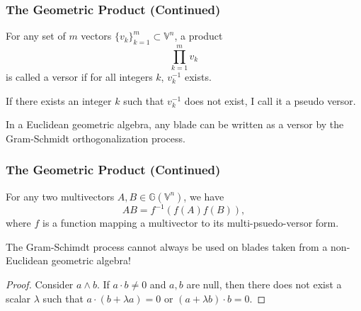 \documentclass{beamer}
\newcommand{\G}{\mathbb{G}}
\newcommand{\V}{\mathbb{V}}
\begin{document}
%

\begin{frame}
\frametitle{The Geometric Product (Continued)}
\begin{definition}
For any set of $m$ vectors $\{v_k\}_{k=1}^m\subset\V^n$, a product
\begin{equation*}
\prod_{k=1}^m v_k
\end{equation*}
is called a versor if for all integers $k$, $v_k^{-1}$ exists.
\end{definition}
If there exists an integer $k$ such that $v_k^{-1}$ does not exist, I call it a pseudo versor.
\begin{lemma}
In a \alert{Euclidean} geometric algebra, any blade can be written as a versor
by the Gram-Schmidt orthogonalization process.
\end{lemma}
\end{frame}

\begin{frame}
\frametitle{The Geometric Product (Continued)}
\begin{example}
For any two multivectors $A,B\in\G(\V^n)$, we have
\begin{equation*}
AB = f^{-1}(f(A)f(B)),
\end{equation*}
where $f$ is a function mapping a multivector to its multi-psuedo-versor form.
\end{example}
\begin{lemma}
The Gram-Schimdt process cannot always be used on blades taken from
a \alert{non-Euclidean} geometric algebra!
\end{lemma}
\begin{proof}
Consider $a\wedge b$.  If $a\cdot b\neq 0$ and $a,b$ are null, then there does not exist a
scalar $\lambda$ such that $a\cdot(b+\lambda a)=0$ or $(a+\lambda b)\cdot b=0$.
\end{proof}
\end{frame}
\end{document}
